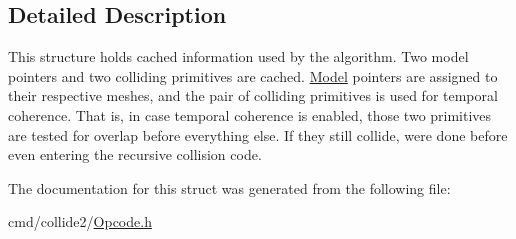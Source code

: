 \subsection{Detailed Description}
This structure holds cached information used by the algorithm. Two model pointers and two colliding primitives are cached. \hyperlink{classOpcode_1_1Model}{Model} pointers are assigned to their respective meshes, and the pair of colliding primitives is used for temporal coherence. That is, in case temporal coherence is enabled, those two primitives are tested for overlap before everything else. If they still collide, we\textquotesingle{}re done before even entering the recursive collision code. 

The documentation for this struct was generated from the following file\+:\begin{DoxyCompactItemize}
\item 
cmd/collide2/\hyperlink{Opcode_8h}{Opcode.\+h}\end{DoxyCompactItemize}
